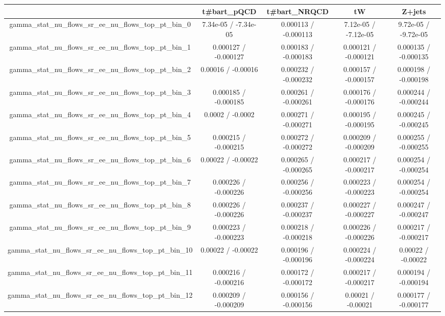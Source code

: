 \documentclass[10pt]{article}
\begin{document}
\begin{table}[htbp]
\begin{center}
\begin{tabular}{|c|c|c|c|c|}
\hline 
      & t#bar{t}_{pQCD}      & t#bar{t}_{NRQCD}      & tW      & Z+jets \\ 
\hline 
  gamma_stat_nu_flows_sr_ee_nu_flows_top_pt_bin_0 & 7.34e-05 / -7.34e-05 & 0.000113 / -0.000113 & 7.12e-05 / -7.12e-05 & 9.72e-05 / -9.72e-05 \\ 
  gamma_stat_nu_flows_sr_ee_nu_flows_top_pt_bin_1 & 0.000127 / -0.000127 & 0.000183 / -0.000183 & 0.000121 / -0.000121 & 0.000135 / -0.000135 \\ 
  gamma_stat_nu_flows_sr_ee_nu_flows_top_pt_bin_2 & 0.00016 / -0.00016 & 0.000232 / -0.000232 & 0.000157 / -0.000157 & 0.000198 / -0.000198 \\ 
  gamma_stat_nu_flows_sr_ee_nu_flows_top_pt_bin_3 & 0.000185 / -0.000185 & 0.000261 / -0.000261 & 0.000176 / -0.000176 & 0.000244 / -0.000244 \\ 
  gamma_stat_nu_flows_sr_ee_nu_flows_top_pt_bin_4 & 0.0002 / -0.0002 & 0.000271 / -0.000271 & 0.000195 / -0.000195 & 0.000245 / -0.000245 \\ 
  gamma_stat_nu_flows_sr_ee_nu_flows_top_pt_bin_5 & 0.000215 / -0.000215 & 0.000272 / -0.000272 & 0.000209 / -0.000209 & 0.000255 / -0.000255 \\ 
  gamma_stat_nu_flows_sr_ee_nu_flows_top_pt_bin_6 & 0.00022 / -0.00022 & 0.000265 / -0.000265 & 0.000217 / -0.000217 & 0.000254 / -0.000254 \\ 
  gamma_stat_nu_flows_sr_ee_nu_flows_top_pt_bin_7 & 0.000226 / -0.000226 & 0.000256 / -0.000256 & 0.000223 / -0.000223 & 0.000254 / -0.000254 \\ 
  gamma_stat_nu_flows_sr_ee_nu_flows_top_pt_bin_8 & 0.000226 / -0.000226 & 0.000237 / -0.000237 & 0.000227 / -0.000227 & 0.000247 / -0.000247 \\ 
  gamma_stat_nu_flows_sr_ee_nu_flows_top_pt_bin_9 & 0.000223 / -0.000223 & 0.000218 / -0.000218 & 0.000226 / -0.000226 & 0.000217 / -0.000217 \\ 
  gamma_stat_nu_flows_sr_ee_nu_flows_top_pt_bin_10 & 0.00022 / -0.00022 & 0.000196 / -0.000196 & 0.000224 / -0.000224 & 0.00022 / -0.00022 \\ 
  gamma_stat_nu_flows_sr_ee_nu_flows_top_pt_bin_11 & 0.000216 / -0.000216 & 0.000172 / -0.000172 & 0.000217 / -0.000217 & 0.000194 / -0.000194 \\ 
  gamma_stat_nu_flows_sr_ee_nu_flows_top_pt_bin_12 & 0.000209 / -0.000209 & 0.000156 / -0.000156 & 0.00021 / -0.00021 & 0.000177 / -0.000177 \\ 

\end{tabular}
\end{center}
\end{table}
\end{document}
